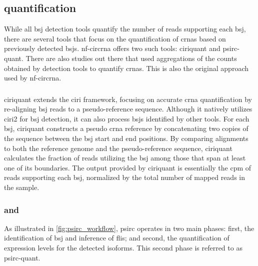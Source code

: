 \subsection{ quantification}
\label{sec:crna_quantification}

While all \gls{bsj} detection tools quantify the number of reads supporting
each \gls{bsj}, there are several tools that focus on the quantification of
\glspl{crna} based on previously detected \glspl{bsj}.
\gls{nf-circrna} offers two such tools: \gls{ciriquant} and
psirc-quant.
There are also studies out there that used aggregations of the counts obtained
by detection tools to quantify \glspl{crna}\supercite{gaffo_sensitive_2022}.
This is also the original approach used by
\gls{nf-circrna}\supercite{digby_nf-corecircrna_2023}.

\subsubsection{}
\label{sec:ciriquant}
\gls{ciriquant} extends the \gls{ciri} framework, focusing on accurate
\gls{crna} quantification by
re-aligning \gls{bsj} reads to a pseudo-reference sequence.
Although it natively utilizes \gls{ciri2} for \gls{bsj} detection, it can also
process \glspl{bsj} identified by other tools\supercite{zhang_accurate_2020}.
For each \gls{bsj}, \gls{ciriquant} constructs a pseudo \gls{crna} reference by
concatenating two copies of the sequence between the \gls{bsj} start and end
positions.
By comparing alignments to both the reference genome and the pseudo-reference
sequence, \gls{ciriquant} calculates the fraction of reads utilizing the
\gls{bsj} among those that span at least one of its
boundaries\supercite{zhang_accurate_2020}.
The output provided by \gls{ciriquant} is essentially the \gls{cpm} of reads
supporting each \gls{bsj}, normalized by the total number of mapped reads in
the sample.

\subsubsection{ and }
\label{sec:psirc}
As illustrated in \cref{fig:psirc_workflow}, \gls{psirc} operates in two main
phases: first, the identification of \gls{bsj} and inference of \glspl{fli};
and second, the quantification of expression levels for the detected
isoforms\supercite{yu_quantifying_2021}.
This second phase is referred to as \gls{psirc-quant}.


